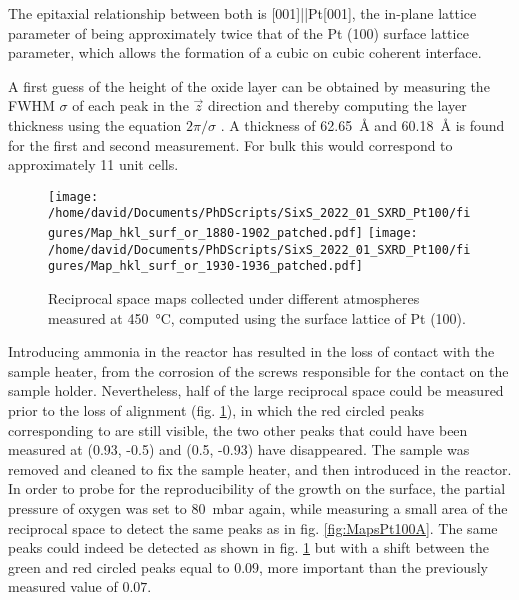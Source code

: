 The epitaxial relationship between both is [001]||Pt[001], the in-plane lattice parameter of  being approximately twice that of the Pt (100) surface lattice parameter, which allows the formation of a cubic on cubic coherent interface.

A first guess of the height of the oxide layer can be obtained by measuring the FWHM $\sigma$ of each peak in the $\vec{z}$ direction and thereby computing the layer thickness using the equation $2\pi/\sigma$ \parencite{Warren1990}.
A thickness of \qty{62.65}{\angstrom} and \qty{60.18}{\angstrom} is found for the first and second measurement.
For bulk  this would correspond to approximately 11 unit cells.

\begin{figure}[!htb]
    \centering
    \texttt{[image: /home/david/Documents/PhDScripts/SixS\_2022\_01\_SXRD\_Pt100/figures/Map\_hkl\_surf\_or\_1880-1902\_patched.pdf]}
    \texttt{[image: /home/david/Documents/PhDScripts/SixS\_2022\_01\_SXRD\_Pt100/figures/Map\_hkl\_surf\_or\_1930-1936\_patched.pdf]}
    \caption{
        Reciprocal space maps collected under different atmospheres measured at \qty{450}{\degreeCelsius}, computed using the surface lattice of Pt (100).
    }
    \label{fig:MapsPt100B}
\end{figure}

Introducing ammonia in the reactor has resulted in the loss of contact with the sample heater, from the corrosion of the screws responsible for the contact on the sample holder.
Nevertheless, half of the large reciprocal space could be measured prior to the loss of alignment (fig. \ref{fig:MapsPt100B}), in which the red circled peaks corresponding to  are still visible, the two other peaks that could have been measured at (0.93, -0.5) and (0.5, -0.93) have disappeared.
The sample was removed and cleaned to fix the sample heater, and then introduced in the reactor.
In order to probe for the reproducibility of the  growth on the surface, the partial pressure of oxygen was set to \qty{80}{\milli\bar} again, while measuring a small area of the reciprocal space to detect the same peaks as in fig. \ref{fig:MapsPt100A}.
The same peaks could indeed be detected as shown in fig. \ref{fig:MapsPt100B} but with a shift between the green and red circled peaks equal to $0.09$, more important than the previously measured value of $0.07$.

